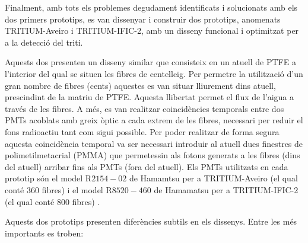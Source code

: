 Finalment, amb tots els problemes degudament identificats i solucionats amb els dos primers prototips, es van dissenyar i construir dos prototips, anomenats TRITIUM-Aveiro i TRITIUM-IFIC-2, amb un disseny funcional i optimitzat per a la detecció del triti. 

Aquests dos presenten un disseny similar que consisteix en un atuell de PTFE a l'interior del qual se situen les fibres de centelleig. Per permetre la utilització d'un gran nombre de fibres (cents) aquestes es van situar lliurement dins atuell, prescindint de la matriu de PTFE. Aquesta llibertat permet el flux de l'aigua a través de les fibres. A més, es van realitzar coincidències temporals entre dos PMTs acoblats amb greix òptic a cada extrem de les fibres, necessari per reduir el fons radioactiu tant com sigui possible. Per poder realitzar de forma segura aquesta coincidència temporal va ser necessari introduir al atuell dues finestres de polimetilmetacrial (PMMA) que permetessin als fotons generats a les fibres (dins del atuell) arribar fins als PMTs (fora del atuell). Els PMTs utilitzats en cada prototip són el model R$2154-02$ de Hamamtsu \cite{DataSheetPMTsAveiro} per a TRITIUM-Aveiro (el qual conté 360 fibres) i el model R$8520-460$ de Hamamatsu \cite{DataSheetPMTs} per a TRITIUM-IFIC-2 (el qual conté 800 fibres) .

Aquests dos prototips presenten diferències subtils en els dissenys. Entre les més importants es troben:

